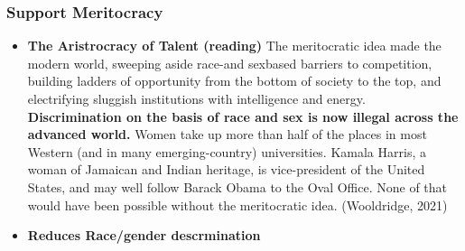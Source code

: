 \documentclass[11pt]{article}
\begin{document}
\subsubsection{Support Meritocracy}
\begin{itemize}
 \item {
       \textbf{The Aristrocracy of Talent (reading)}
       The meritocratic idea made the modern world, sweeping aside race-and sexbased barriers to competition, building ladders of opportunity from the bottom of society to the top, and electrifying sluggish institutions with intelligence and energy. \textbf{Discrimination on the basis of race and sex is now illegal across the advanced world.} Women take up more than half of the places in most Western (and in many emerging-country) universities. Kamala Harris, a woman of Jamaican and Indian heritage, is vice-president of the United States, and may well follow Barack Obama to the Oval Office. None of that would have been possible without the meritocratic idea. (Wooldridge, 2021)
       }
       \item{
                   \textbf{Reduces Race/gender descrmination}
                   
}
\end{itemize}
\end{document}
